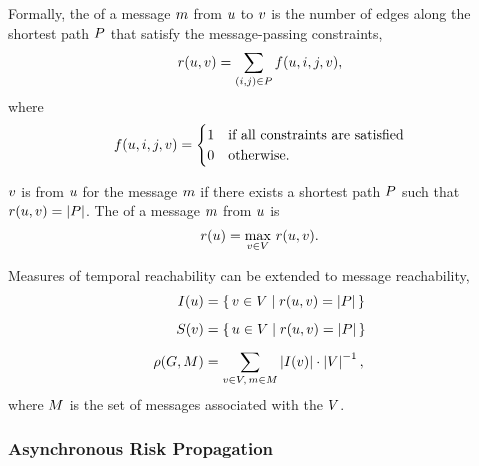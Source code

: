 Formally, the  of a message $m$ from \vertexName $u$ to \vertexName $v$ is the number of edges along the shortest path $P$ that satisfy the message-passing constraints,
\begin{equation*}
  r(u, v) = \sum_{(i, j) \in P} f(u, i, j, v),
\end{equation*}
where
\begin{equation*}
  f(u, i, j, v) = 
    \begin{cases}
      1 & \text{if all constraints are satisfied} \\ 
      0 & \text{otherwise.}
    \end{cases}
\end{equation*}

\VertexName $v$ is  from \vertexName $u$ for the message $m$ if there exists a shortest path $P$ such that $r(u, v) = \left\vert P \right\vert$. The  of a message $m$ from \vertexName $u$ is
\begin{equation}\label{eq:vreach}
  r(u) = \max_{v \in V} \, r(u, v).
\end{equation}

Measures of temporal reachability can be extended to message reachability,
\begin{align*}
  I(u) &= \set{ v\in V| r(u, v) = \left\vert P\right\vert} \\[5pt]
  S(v) &= \set{ u\in V| r(u, v) = \left\vert P\right\vert} \\[5pt]
  \rho(G, M) &= \sum_{v \in V, \,m \in M} \left\vert I(v) \right\vert \cdot \left\vert V \right\vert^{-1},
\end{align*}
where $M$ is the set of messages associated with the \verticesName $V$.

\subsubsection*{Asynchronous Risk Propagation}

